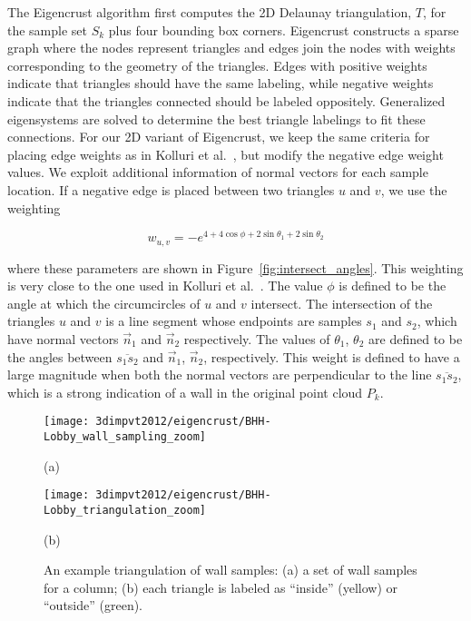 \documentclass[12pt,onecolumn,oneside]{book}
\begin{document}
The Eigencrust algorithm first computes the 2D Delaunay triangulation, $T$, for the sample set $S_k$ plus four bounding box corners.  Eigencrust constructs a sparse graph where the nodes represent triangles and edges join the nodes with weights corresponding to the geometry of the triangles.  Edges with positive weights indicate that triangles should have the same labeling, while negative weights indicate that the triangles connected should be labeled oppositely.  Generalized eigensystems are solved to determine the best triangle labelings to fit these connections.  For our 2D variant of Eigencrust, we keep the same criteria for placing edge weights as in Kolluri et al.~\cite{EigencrustShewchuk}, but modify the negative edge weight values.  We exploit additional information of normal vectors for each sample location. If a negative edge is placed between two triangles $u$ and $v$, we use the weighting

\begin{equation}
w_{u,v} = - e ^ {4 + 4 \cos \phi + 2 \sin \theta_1 + 2 \sin \theta_2}
\label{neg_edge_weight}
\end{equation}

\noindent where these parameters are shown in Figure~\ref{fig:intersect_angles}.  This weighting is very close to the one used in Kolluri et al.~\cite{EigencrustShewchuk}.  The value $\phi$ is defined to be the angle at which the circumcircles of $u$ and $v$ intersect.  The intersection of the triangles $u$ and $v$ is a line segment whose endpoints are samples $s_1$ and $s_2$, which have normal vectors $\vec{n}_1$ and $\vec{n}_2$ respectively.  The values of $\theta_1$, $\theta_2$ are defined to be the angles between $\overline{s_1 s_2}$ and $\vec{n}_1$, $\vec{n}_2$, respectively.  This weight is defined to have a large magnitude when both the normal vectors are perpendicular to the line $\overline{s_1 s_2}$, which is a strong indication of a wall in the original point cloud $P_k$.

\begin{figure}[t]

\begin{minipage}[b]{0.5\linewidth}
  \centering
  \centerline{\texttt{[image: 3dimpvt2012/eigencrust/BHH-Lobby\_wall\_sampling\_zoom]}}
  \centerline{(a)}
\end{minipage}
\hfill
\begin{minipage}[b]{0.5\linewidth}
  \centering
  \centerline{\texttt{[image: 3dimpvt2012/eigencrust/BHH-Lobby\_triangulation\_zoom]}}
  \centerline{(b)}
\end{minipage}

\caption[Example triangulation of wall samples.]{An example triangulation of wall samples: (a) a set of wall samples for a column; (b) each triangle is labeled as ``inside'' (yellow) or ``outside'' (green).}
\label{fig:eigencrust_triangulation}

\end{figure}
\end{document}
